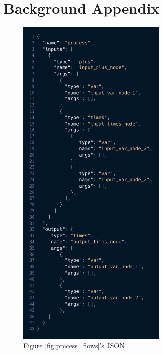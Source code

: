 \chapter{Background Appendix}

\begin{figure}
    \centering
    \includegraphics[width=0.65\textwidth]{overleaf/images/example_json.png}
    \caption{Figure \ref{fig:process_flows}'s JSON}
    \label{appendix:fig:example_json}
\end{figure}

